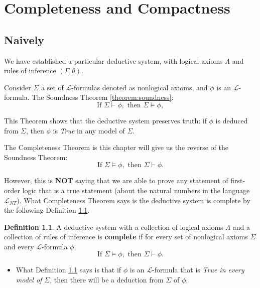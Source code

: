 \documentclass[11pt,letterpaper]{book}
\theoremstyle{definition}
\newtheorem{definition}{Definition}[section]
\begin{document}
\chapter{Completeness and Compactness}

\section{Naively}


We have established a particular deductive system, with logical axioms
$\Lambda$ and rules of inference $(\Gamma, \theta)$.

Consider $\Sigma$ a set of $\mathcal{L}$-formulas denoted as nonlogical 
axioms, and $\phi$ is an
$\mathcal{L}$-formula.  The Soundness Theorem \ref{theorem:soundness}:
$$ \text{If } \Sigma \vdash \phi, \text{ then } \Sigma \models \phi ,$$

This Theorem shows that the deductive system preserves truth: if $\phi$
is deduced from $\Sigma$, then $\phi$ is \emph{True} in any model of
$\Sigma$.

The Completeness Theorem is this chapter will give us the reverse of the
Soundness Theorem:
$$\text{If } \Sigma \models \phi, \text{ then } \Sigma \vdash \phi .$$

However, this is \textbf{NOT} saying that we are able to prove any
statement of first-order logic that is a true statement (about the
natural numbers in the language $\mathcal{L}_{NT}$). What Completeness
Theorem says is the deductive system is complete by the following
Definition \ref{def:complete}.



\begin{definition}\label{def:complete}
A deductive system with a collection of logical axioms $\Lambda$ and a
collection of rules of inference is \textbf{complete} if for every set
of nonlogical axioms $\Sigma$ and every $\mathcal{L}$-formula $\phi$,
$$ \text{If } \Sigma \models \phi, \text{ then } \Sigma \vdash \phi . $$
\end{definition}


\begin{itemize}
\item{What Definition \ref{def:complete} says is that if $\phi$ is an
$\mathcal{L}$-formula that is \emph{True in every model of $\Sigma$},
then there will be a deduction from $\Sigma$ of $\phi$.}

\end{itemize}
\end{document}
